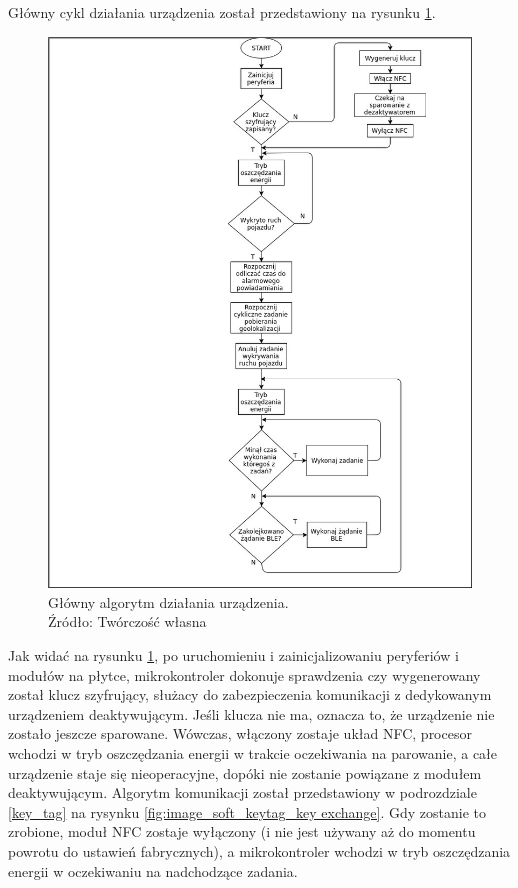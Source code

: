 Główny cykl działania urządzenia został przedstawiony na rysunku \ref{fig:image_soft_mainboard_main_alghoritm}.

\begin{figure}[H]
	\centering
	\includegraphics[width=16cm]{img/software/mainboard/Tracking_alghoritm.jpg}
	\caption{Główny algorytm działania urządzenia. 
	\\Źródło: Twórczość własna}
	\label{fig:image_soft_mainboard_main_alghoritm}
\end{figure}

Jak widać na rysunku \ref{fig:image_soft_mainboard_main_alghoritm}, po uruchomieniu i zainicjalizowaniu peryferiów i modułów na płytce, mikrokontroler dokonuje sprawdzenia czy wygenerowany został klucz szyfrujący, służacy do zabezpieczenia komunikacji z dedykowanym urządzeniem deaktywującym. Jeśli klucza nie ma, oznacza to, że urządzenie nie zostało jeszcze sparowane. Wówczas, włączony zostaje układ NFC, procesor wchodzi w tryb oszczędzania energii w trakcie oczekiwania na parowanie, a całe urządzenie staje się nieoperacyjne, dopóki nie zostanie powiązane z modułem deaktywującym. Algorytm komunikacji został przedstawiony w podrozdziale \ref{key_tag} na rysynku \ref{fig:image_soft_keytag_key exchange}. Gdy zostanie to zrobione, moduł NFC zostaje wyłączony (i nie jest używany aż do momentu powrotu do ustawień fabrycznych), a mikrokontroler wchodzi w tryb oszczędzania energii w oczekiwaniu na nadchodzące zadania.


